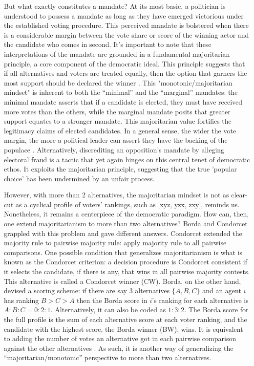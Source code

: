 \documentclass[hidelinks,11pt]{article} \usepackage[utf8]{inputenc}
\begin{document}
But what exactly constitutes a mandate? At its most basic, a politician is
understood to possess a mandate as long as they have emerged victorious under
the established voting procedure. This perceived mandate is bolstered when there
is a considerable margin between the vote share or score of the winning actor
and the candidate who comes in second. It's important to note that these
interpretations of the mandate are grounded in a fundamental majoritarian
principle, a core component of the democratic ideal. This principle suggests
that if all alternatives and voters are treated equally, then the option that
garners the most support should be declared the winner
\parencite{dahl1989democracy}. This "monotonic/majoritarian mindset" is inherent
to both the ``minimal'' and the ``marginal'' mandates: the minimal mandate asserts that
if a candidate is elected, they must have received more votes than the others,
while the marginal mandate posits that greater support equates to a stronger
mandate. This majoritarian value fortifies the legitimacy claims of elected
candidates. In a general sense, the wider the vote margin, the more a political
leader can assert they have the backing of the populace
\parencite{grossman2022majoritarian}. Alternatively, discrediting an
opposition's mandate by alleging electoral fraud is a tactic that yet again
hinges on this central tenet of democratic ethos. It exploits the majoritarian
principle, suggesting that the true 'popular choice' has been undermined by an
unfair process.

However, with more than 2 alternatives, the majoritarian mindset is not as
clear-cut as a cyclical profile of voters' rankings, such as [xyz, yzx, zxy],
reminds us. Nonetheless, it remains a centerpiece of the democratic paradigm.
How can, then, one extend majoritarianism to more than two alternatives? Borda
and Condorcet grappled with this problem and gave different answers. Condorcet
extended the majority rule to pairwise majority rule: apply majority rule to all
pairwise comparisons. One possible condition that generalizes majoritarianism is
what is known as the Condorcet criterion: a decision procedure is Condorcet
consistent if it selects the candidate, if there is any, that wins in all
pairwise majority contests. This alternative is called a Condorcet winner (CW).
Borda, on the other hand, devised a scoring scheme: if there are say 3
alternatives \(\{A,B,C\}\) and an agent \(i\) has ranking \(B>C>A\) then the
Borda score in \(i\)'s ranking for each alternative is \(A:B:C = 0:2:1\).
Alternatively, it can also be coded as \(1:3:2\). The Borda score for the full
profile is the sum of each alternative score at each voter ranking, and the
candidate with the highest score, the Borda winner (BW), wins. It is equivalent
to adding the number of votes an alternative got in each pairwise comparison
against the other alternatives \parencite{nurmi1999voting}. As such, it is
another way of generalizing the ``majoritarian/monotonic'' perspective to more
than two alternatives.
\end{document}
